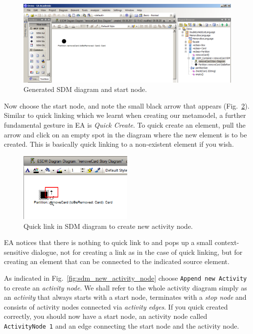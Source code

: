 \begin{figure}[htp]
\begin{center}
  \includegraphics[width=\textwidth]{pics/sdmBilder/removeCard/sdm02RAW}
  \caption{Generated SDM diagram and start node.}  
  \label{fig:sdm_skeleton}
\end{center}
\end{figure}

Now choose the start node, and note the small black arrow that appears
(Fig.~\ref{fig:sdm_quicklink}).  Similar to quick linking which we learnt when
creating our metamodel, a further fundamental gesture in EA is \emph{Quick
Create}. To quick create an element, pull the arrow and click on an empty spot
in the diagram where the new element is to be created.  This is basically quick
linking to a non-existent element if you wish.

\begin{figure}[htp]
\begin{center}
  \includegraphics[width=0.5\textwidth]{pics/sdmBilder/removeCard/sdm03RAW}
  \caption{Quick link in SDM diagram to create new activity node.}  
  \label{fig:sdm_quicklink}
\end{center}
\end{figure}

EA notices that there is nothing to quick link to and pops up a small
context-sensitive dialogue, not for creating a link as in the case of quick
linking, but for creating an element that can be connected to the
indicated source element. 

As indicated in Fig.~\ref{fig:sdm_new_activity_node}
choose \texttt{Append new Activity} to create an \emph{activity node}.  We
shall refer to the whole activity diagram simply as an \emph{activity} that
always starts with a start node, terminates with a \emph{stop node} and consists
of activity nodes connected via \emph{activity edges}.  If you quick created
correctly, you should now have a start node, an activity node called
\texttt{ActivityNode 1} and an edge connecting the start node and the activity
node.

